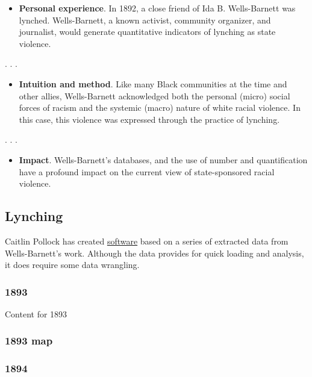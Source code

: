 \documentclass[
  letterpaper,
  DIV=11,
  numbers=noendperiod]{scrartcl}
\providecommand{\tightlist}{%
  \setlength{\itemsep}{0pt}\setlength{\parskip}{0pt}}\usepackage{longtable,booktabs,array}
\begin{document}
\begin{itemize}
\tightlist
\item
  \textbf{Personal experience}. In 1892, a close friend of Ida B.
  Wells-Barnett was lynched. Wells-Barnett, a known activist, community
  organizer, and journalist, would generate quantitative indicators of
  lynching as state violence.
\end{itemize}

. . .

\begin{itemize}
\tightlist
\item
  \textbf{Intuition and method}. Like many Black communities at the time
  and other allies, Wells-Barnett acknowledged both the personal (micro)
  social forces of racism and the systemic (macro) nature of white
  racial violence. In this case, this violence was expressed through the
  practice of lynching.
\end{itemize}

. . .

\begin{itemize}
\tightlist
\item
  \textbf{Impact}. Wells-Barnett's databases, and the use of number and
  quantification have a profound impact on the current view of
  state-sponsored racial violence.
\end{itemize}

\hypertarget{lynching}{%
\subsection{Lynching}\label{lynching}}

Caitlin Pollock has created
\href{https://redrecord.cmjpollock.com/}{software} based on a series of
extracted data from Wells-Barnett's work. Although the data provides for
quick loading and analysis, it does require some data wrangling.

\subsubsection{1893}

Content for 1893

\subsubsection{1893 map}

\subsubsection{1894}
\end{document}
